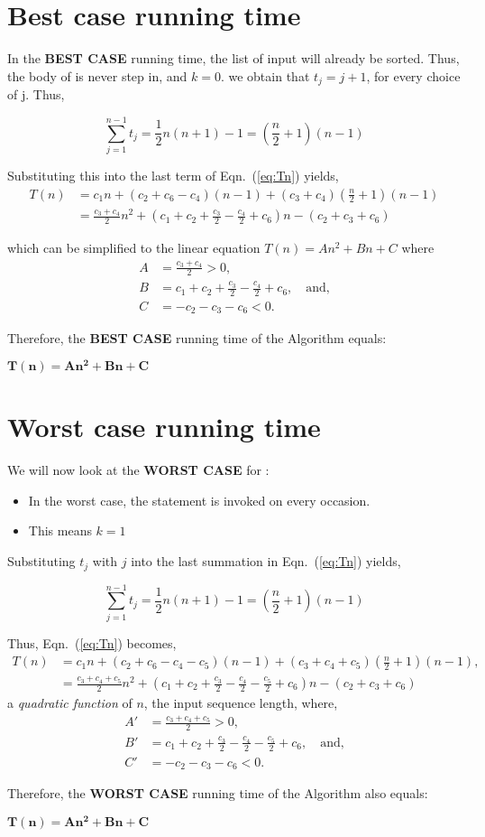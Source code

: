 \documentclass[twoside]{article}
\begin{document}
	\section{Best case running time}
	In the  {\bf BEST CASE} running time, the list of input will already be sorted. Thus, the body of \If is never step in, and $k = 0$. we obtain that $t_j = j+1$, for every choice of j. Thus,
	
	\[
	\sum_{j=1}^{n-1} t_j = \frac{1}{2} n(n+1) - 1 = (\frac{n}{2}+1)(n-1)
	\]
	
	Substituting this into the last term of Eqn.~(\ref{eq:Tn}) yields,
	\begin{align}
	T(n) &= c_1 n +(c_2 + c_6 - c_4)(n-1) + (c_3 + c_4)(\frac{n}{2}+1)(n-1) \\
	&= \frac{c_3+c_4}{2}n^2 + (c_1+c_2+\frac{c_3}{2}-\frac{c_4}{2}+c_6)n - (c_2+c_3+c_6)
	\end{align}
	
	which can be simplified to the linear equation $T(n) = An^2+Bn+C$ where
	\begin{align*}
	A &= \frac{c_3+c_4}{2} > 0,\\
	B &= c_1+c_2+\frac{c_3}{2}-\frac{c_4}{2}+c_6, \quad\text{and,}\\
	C &= -c_2-c_3-c_6 < 0.
	\end{align*}
	
	Therefore, the {\bf BEST CASE} running time of the  Algorithm equals:
	\begin{center}
		$\boldsymbol{T(n) = An^2+Bn+C}$
	\end{center}
	
	\section{Worst case running time}
	We will now look at the {\bf WORST CASE} for :
	\begin{itemize}
		\item In the worst case, the \If statement is invoked on every occasion.
		\item This means $ k = 1$
	\end{itemize}
	
	Substituting $t_{ j }$ with $j$ into the last summation in  Eqn.~(\ref{eq:Tn}) yields,
	
	\[
	\sum_{j=1}^{n-1} t_j = \frac{1}{2} n(n+1) - 1 = (\frac{n}{2}+1)(n-1)
	\]
	
	Thus, Eqn.~(\ref{eq:Tn}) becomes,
	\begin{align*}
	T(n)   &=   c_1 n +(c_2+c_6-c_4-c_5)(n-1) + (c_3+c_4+c_5)(\frac{n}{2}+1)(n-1),\\
	&= \frac{c_3+c_4+c_5}{2} n^2 + (c_1+c_2+\frac{c_3}{2}-\frac{c_4}{2}-\frac{c_5}{2}+c_6) n - (c_2+c_3+c_6)
	\end{align*}
	a \emph{quadratic function} of $n$, the input sequence length, where,
	\begin{align*}
	A' &= \frac{c_3+c_4+c_5}{2} > 0,\\
	B' &= c_1+c_2+\frac{c_3}{2}-\frac{c_4}{2}-\frac{c_5}{2}+c_6, \quad\text{and,}\\
	C' &= -c_{2}-c_{3}-c_{6} < 0.
	\end{align*}
	
	
	Therefore, the {\bf WORST CASE} running time of the  Algorithm also equals:
	\begin{center}
		$\boldsymbol{T(n) = An^2+Bn+C}$
	\end{center}
	
\end{document}

